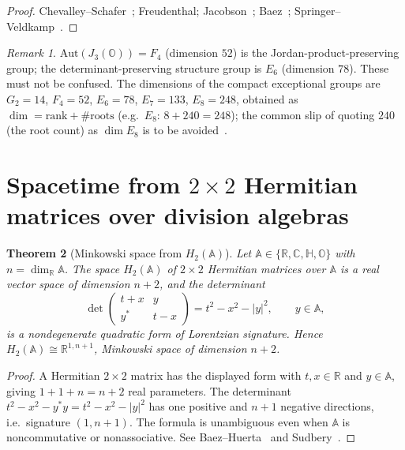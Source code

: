 \documentclass[aps,prresearch,onecolumn,amsmath,amssymb,nofootinbib]{revtex4-2}
\theoremstyle{plain}\newtheorem{theorem}{Theorem}[section]\newtheorem{proposition}[theorem]{Proposition}\newtheorem{lemma}[theorem]{Lemma}\newtheorem{corollary}[theorem]{Corollary}
\theoremstyle{definition}\newtheorem{definition}[theorem]{Definition}\newtheorem{conjecture}[theorem]{Conjecture}
\theoremstyle{remark}\newtheorem{remark}[theorem]{Remark}
\begin{document}
\begin{proof}
Chevalley--Schafer~\cite{ChevalleySchafer1950}; Freudenthal; Jacobson~\cite{Jacobson1968}; Baez~\cite[Sec.~4.2,~4.4]{Baez2002}; Springer--Veldkamp~\cite[Ch.~7]{SpringerVeldkamp2000}.
\end{proof}

\begin{remark}
$\mathrm{Aut}(J_3(\mathbb{O}))=F_4$ (dimension $52$) is the Jordan-product-preserving group; the determinant-preserving structure group is $E_6$ (dimension $78$). These must not be confused. The dimensions of the compact exceptional groups are $G_2=14$, $F_4=52$, $E_6=78$, $E_7=133$, $E_8=248$, obtained as $\dim=\mathrm{rank}+\#\text{roots}$ (e.g.\ $E_8$: $8+240=248$); the common slip of quoting $240$ (the root count) as $\dim E_8$ is to be avoided~\cite{FultonHarris1991}.
\end{remark}

\section{Spacetime from $2\times2$ Hermitian matrices over division algebras}
\label{sec:F2}

\begin{theorem}[Minkowski space from $H_2(\mathbb{A})$]
\label{thm:H2A}
Let $\mathbb{A}\in\{\mathbb{R},\mathbb{C},\mathbb{H},\mathbb{O}\}$ with $n=\dim_\mathbb{R}\mathbb{A}$. The space $H_2(\mathbb{A})$ of $2\times2$ Hermitian matrices over $\mathbb{A}$ is a real vector space of dimension $n+2$, and the determinant
\begin{equation}
\det\begin{pmatrix} t+x & y\\ y^{*} & t-x\end{pmatrix}=t^2-x^2-|y|^2,\qquad y\in\mathbb{A},
\end{equation}
is a nondegenerate quadratic form of Lorentzian signature. Hence $H_2(\mathbb{A})\cong\mathbb{R}^{1,n+1}$, Minkowski space of dimension $n+2$.
\end{theorem}

\begin{proof}
A Hermitian $2\times2$ matrix has the displayed form with $t,x\in\mathbb{R}$ and $y\in\mathbb{A}$, giving $1+1+n=n+2$ real parameters. The determinant $t^2-x^2-y^{*}y=t^2-x^2-|y|^2$ has one positive and $n+1$ negative directions, i.e.\ signature $(1,n+1)$. The formula is unambiguous even when $\mathbb{A}$ is noncommutative or nonassociative. See Baez--Huerta~\cite[Sec.~3]{BaezHuertaSUSY} and Sudbery~\cite{Sudbery1984}.
\end{proof}
\end{document}
